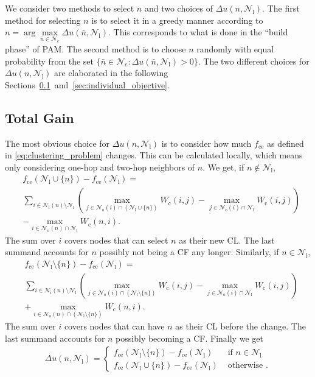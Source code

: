 \documentclass[letterpaper,10pt,conference,twocolumn]{IEEEtran}
\newcommand{\set}[1]{\mathcal{#1}}
\newcommand{\op}[1]{\mathrm{#1}}
\theoremstyle{definition}
\begin{document}
We consider two methods to select $n$ and two choices of $\Delta u(n,\set{N}_\op{l})$.
The first method for selecting $n$ is to select it in a greedy manner according to $n = \arg \max\limits_{\bar{n} \in \set{N}_\op{c}} \Delta u(\bar{n},\set{N}_\op{l})$. This corresponds to what is done in the ``build phase'' of PAM. The second method is to choose $n$ randomly with equal probability from the set $\{\bar{n} \in \set{N}_\op{c}: \Delta u(\bar{n},\set{N}_\op{l}) > 0\}$. The two different choices for $\Delta u(n,\set{N}_\op{l})$ are elaborated in the following Sections~\ref{sec:central_objective}~and~\ref{sec:individual_objective}.

\subsection{Total Gain}
\label{sec:central_objective}

The most obvious choice for $\Delta u(n,\set{N}_\op{l})$ is to consider how much $f_\op{ce}$ as defined in \eqref{eq:clustering_problem} changes. This can be calculated locally, which means only considering one-hop and two-hop neighbors of $n$. We get, if $n \notin \set{N}_\op{l}$,
\begin{align*}
 &f_\op{ce}(\set{N}_\op{l} \cup \{n\}) - f_\op{ce}(\set{N}_\op{l})=\\
 &\sum\limits_{i \in \set{N}_{\op{i}}(n)\setminus \set{N}_\op{l}} \left( 
 \max\limits_{j \in \set{N}_{\op{o}}(i) \cap (\set{N}_\op{l} \cup \{n\})} W_\op{c}(i,j)
 - \max\limits_{j \in \set{N}_{\op{o}}(i) \cap \set{N}_\op{l}} W_\op{c}(i,j)
 \right)\\
 &- \max\limits_{i \in \set{N}_{\op{o}}(n) \cap \set{N}_\op{l}} W_\op{c}(n,i).
\end{align*}
The sum over $i$ covers nodes that can select $n$ as their new CL. The last summand accounts for $n$ possibly not being a CF any longer.
Similarly, if $n \in \set{N}_\op{l}$,
\begin{align*}
 &f_\op{ce}(\set{N}_\op{l} \setminus \{n\}) - f_\op{ce}(\set{N}_\op{l}) =\\
 &\sum\limits_{i \in \set{N}_{\op{i}}(n)\setminus \set{N}_\op{l}} \left( 
 \max\limits_{j \in \set{N}_{\op{o}}(i) \cap (\set{N}_\op{l} \setminus \{n\})} W_\op{c}(i,j)
 - \max\limits_{j \in \set{N}_{\op{o}}(i) \cap \set{N}_\op{l}} W_\op{c}(i,j)
 \right)\\
 &+ \max\limits_{i \in \set{N}_{\op{o}}(n) \cap (\set{N}_\op{l} \setminus \{n\})} W_\op{c}(n,i). \end{align*}
The sum over $i$ covers nodes that can have $n$ as their CL before the change. The last summand accounts for $n$ possibly becoming a CF. Finally we get
\begin{align}
 \Delta u(n,\set{N}_\op{l}) = \left\{ \begin{array}{ll}
                   f_\op{ce}(\set{N}_\op{l} \setminus \{n\}) - f_\op{ce}(\set{N}_\op{l}) & \text{ if } n \in \set{N}_\op{l}\\
                   f_\op{ce}(\set{N}_\op{l} \cup \{n\}) - f_\op{ce}(\set{N}_\op{l}) & \text{ otherwise }.
                  \end{array} \right.\label{eq:delta_u_c}
\end{align}
\end{document}
